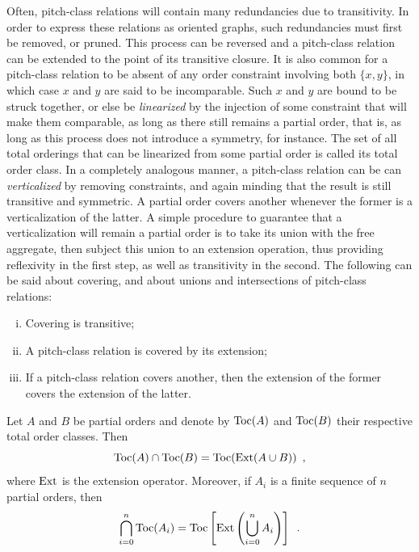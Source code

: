 Often, pitch-class relations will contain many redundancies due to transitivity. In order to express these relations as oriented graphs, such redundancies must first be removed, or pruned. This process can be reversed and a pitch-class relation can be extended to the point of its transitive closure. It is also common for a pitch-class relation to be absent of any order constraint involving both $\{ x, y \}$, in which case $x$ and $y$ are said to be incomparable. Such $x$ and $y$ are bound to be struck together, or else be \emph{linearized} by the injection of some constraint that will make them comparable, as long as there still remains a partial order, that is, as long as this process does not introduce a symmetry, for instance. The set of all total orderings that can be linearized from some partial order is called its total order class. In a completely analogous manner, a pitch-class relation can be can \emph{verticalized} by removing constraints, and again minding that the result is still transitive and symmetric. A partial order covers another whenever the former is a verticalization of the latter. A simple procedure to guarantee that a verticalization will remain a partial order is to take its union with the free aggregate, then subject this union to an extension operation, thus providing reflexivity in the first step, as well as transitivity in the second. The following can be said about covering, and about unions and intersections of pitch-class relations:

\begin{theorem}
    \cite[193]{Starr1984}
    \begin{enumerate}[i.]
        \item Covering is transitive;
        \item A pitch-class relation is covered by its extension;
        \item If a pitch-class relation covers another, then the extension of the former covers the extension of the latter.
    \end{enumerate}
\end{theorem}

\begin{theorem}
    \cite[194]{Starr1984}
    \label{starr-theorem}
    Let $A$ and $B$ be partial orders and denote by $\operatorname{Toc}(A)$ and $\operatorname{Toc}(B)$ their respective total order classes. Then
    \begin{equation}
        \operatorname{Toc}(A) \cap \operatorname{Toc}(B) = \operatorname{Toc}(\operatorname{Ext}(A \cup B)) \enspace,
    \end{equation}
    where $\operatorname{Ext}$ is the extension operator. Moreover, if $A_i$ is a finite sequence of $n$ partial orders, then
    \begin{equation}
        \bigcap_{i = 0}^{n} \operatorname{Toc}(A_i) = \operatorname{Toc} \left[ \operatorname{Ext}\left ( \bigcup_{i = 0}^{n} A_i \right) \right] \enspace.
    \end{equation}
\end{theorem}

